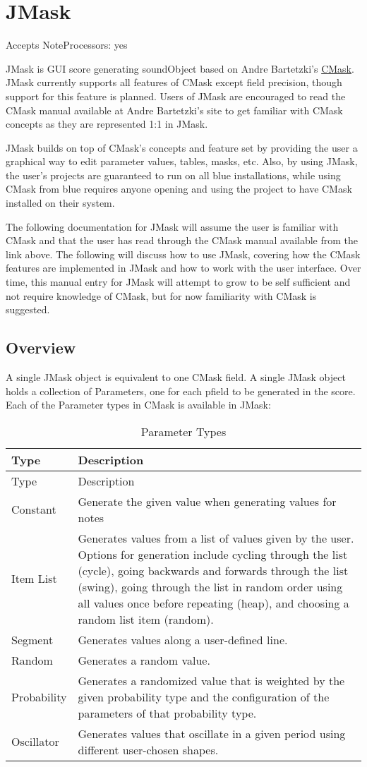 \section{JMask}\label{jmask}

Accepts NoteProcessors: yes

JMask is GUI score generating soundObject based on Andre Bartetzki's
\href{http://www.bartetzki.de/en/software.html}{CMask}. JMask currently
supports all features of CMask except field precision, though support
for this feature is planned. Users of JMask are encouraged to read the
CMask manual available at Andre Bartetzki's site to get familiar with
CMask concepts as they are represented 1:1 in JMask.

JMask builds on top of CMask's concepts and feature set by providing the
user a graphical way to edit parameter values, tables, masks, etc. Also,
by using JMask, the user's projects are guaranteed to run on all blue
installations, while using CMask from blue requires anyone opening and
using the project to have CMask installed on their system.

The following documentation for JMask will assume the user is familiar
with CMask and that the user has read through the CMask manual available
from the link above. The following will discuss how to use JMask,
covering how the CMask features are implemented in JMask and how to work
with the user interface. Over time, this manual entry for JMask will
attempt to grow to be self sufficient and not require knowledge of
CMask, but for now familiarity with CMask is suggested.

\subsection{Overview}\label{jmaskOverview}

A single JMask object is equivalent to one CMask field. A single JMask
object holds a collection of Parameters, one for each pfield to be
generated in the score. Each of the Parameter types in CMask is
available in JMask:

\begin{longtable}[]{@{}ll@{}}
\caption{Parameter Types}\tabularnewline
\toprule
Type & Description\tabularnewline
\midrule
\endfirsthead
\toprule
Type & Description\tabularnewline
\midrule
\endhead
Constant & Generate the given value when generating values for
notes\tabularnewline
Item List & Generates values from a list of values given by the user.
Options for generation include cycling through the list (cycle), going
backwards and forwards through the list (swing), going through the list
in random order using all values once before repeating (heap), and
choosing a random list item (random).\tabularnewline
Segment & Generates values along a user-defined line.\tabularnewline
Random & Generates a random value.\tabularnewline
Probability & Generates a randomized value that is weighted by the given
probability type and the configuration of the parameters of that
probability type.\tabularnewline
Oscillator & Generates values that oscillate in a given period using
different user-chosen shapes.\tabularnewline
\bottomrule
\end{longtable}

